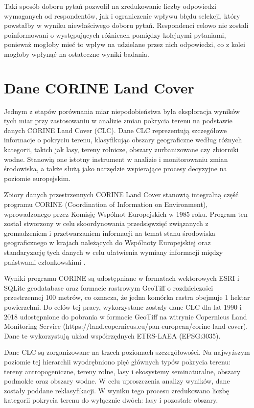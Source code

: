 \documentclass{amuthesis}
\begin{document}
Taki sposób doboru pytań pozwolił na zredukowanie liczby odpowiedzi
wymaganych od respondentów, jak i ograniczenie wpływu błędu selekcji,
który powstałby w wyniku niewłaściwego doboru pytań. Respondenci celowo
nie zostali poinformowani o występujących różnicach pomiędzy kolejnymi
pytaniami, ponieważ mogłoby mieć to wpływ na udzielane przez nich
odpowiedzi, co z kolei mogłoby wpłynąć na ostateczne wyniki badania.

\hypertarget{sec-CLC}{%
\section{Dane CORINE Land Cover}\label{sec-CLC}}

Jednym z etapów porównania miar niepodobieństwa była eksploracja wyników
tych miar przy zastosowaniu w analizie zmian pokrycia terenu na
podstawie danych CORINE Land Cover (CLC). Dane CLC reprezentują
szczegółowe informacje o pokryciu terenu, klasyfikując obszary
geograficzne według różnych kategorii, takich jak lasy, tereny rolnicze,
obszary zurbanizowane czy zbiorniki wodne. Stanowią one istotny
instrument w analizie i monitorowaniu zmian środowiska, a także służą
jako narzędzie wspierające procesy decyzyjne na poziomie europejskim.

Zbiory danych przestrzennych CORINE Land Cover stanowią integralną część
programu CORINE (Coordination of Information on Environment),
wprowadzonego przez Komisję Wspólnot Europejskich w 1985 roku. Program
ten został stworzony w celu skoordynowania przedsięwzięć związanych z
gromadzeniem i przetwarzaniem informacji na temat stanu środowiska
geograficznego w krajach należących do Wspólnoty Europejskiej oraz
standaryzację tych danych w celu ułatwienia wymiany informacji między
państwami członkowskimi \autocite{Bielecka_Ciolkosz_2004}.

Wyniki programu CORINE są udostępniane w formatach wektorowych ESRI i
SQLite geodatabase oraz formacie rastrowym GeoTiff o rozdzielczości
przestrzennej 100 metrów, co oznacza, że jedna komórka rastra obejmuje 1
hektar powierzchni. Do celów tej pracy, wykorzystane zostały dane CLC
dla lat 1990 i 2018 udostępnione do pobrania w formacie GeoTiff na
witrynie Copernicus Land Monitoring Service
(https://land.copernicus.eu/pan-european/corine-land-cover). Dane te
wykorzystują układ współrzędnych ETRS-LAEA (EPSG:3035).

Dane CLC są zorganizowane na trzech poziomach szczegółowości. Na
najwyższym poziomie tej hierarchii wyodrębniono pięć głównych typów
pokrycia terenu: tereny antropogeniczne, tereny rolne, lasy i ekosystemy
seminaturalne, obszary podmokłe oraz obszary wodne. W celu uproszczenia
analizy wyników, dane zostały poddane reklasyfikacji. W wyniku tego
procesu zredukowano liczbę kategorii pokrycia terenu do wyłącznie dwóch:
lasy i pozostałe obszary.
\end{document}
